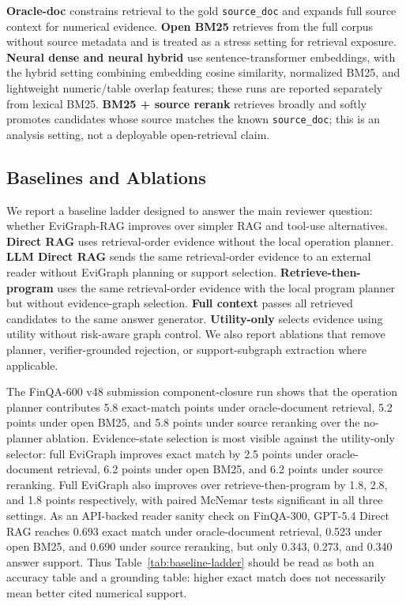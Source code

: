\documentclass[letterpaper]{article}
\begin{document}
\textbf{Oracle-doc} constrains retrieval to the gold \texttt{source\_doc} and expands full source context for numerical evidence.
\textbf{Open BM25} retrieves from the full corpus without source metadata and is treated as a stress setting for retrieval exposure.
\textbf{Neural dense and neural hybrid} use sentence-transformer embeddings, with the hybrid setting combining embedding cosine similarity, normalized BM25, and lightweight numeric/table overlap features; these runs are reported separately from lexical BM25.
\textbf{BM25 + source rerank} retrieves broadly and softly promotes candidates whose source matches the known \texttt{source\_doc}; this is an analysis setting, not a deployable open-retrieval claim.

\subsection{Baselines and Ablations}

We report a baseline ladder designed to answer the main reviewer question: whether EviGraph-RAG improves over simpler RAG and tool-use alternatives.
\textbf{Direct RAG} uses retrieval-order evidence without the local operation planner.
\textbf{LLM Direct RAG} sends the same retrieval-order evidence to an external reader without EviGraph planning or support selection.
\textbf{Retrieve-then-program} uses the same retrieval-order evidence with the local program planner but without evidence-graph selection.
\textbf{Full context} passes all retrieved candidates to the same answer generator.
\textbf{Utility-only} selects evidence using utility without risk-aware graph control.
We also report ablations that remove planner, verifier-grounded rejection, or support-subgraph extraction where applicable.

The FinQA-600 v48 submission component-closure run shows that the operation planner contributes 5.8 exact-match points under oracle-document retrieval, 5.2 points under open BM25, and 5.8 points under source reranking over the no-planner ablation.
Evidence-state selection is most visible against the utility-only selector: full EviGraph improves exact match by 2.5 points under oracle-document retrieval, 6.2 points under open BM25, and 6.2 points under source reranking.
Full EviGraph also improves over retrieve-then-program by 1.8, 2.8, and 1.8 points respectively, with paired McNemar tests significant in all three settings.
As an API-backed reader sanity check on FinQA-300, GPT-5.4 Direct RAG reaches 0.693 exact match under oracle-document retrieval, 0.523 under open BM25, and 0.690 under source reranking, but only 0.343, 0.273, and 0.340 answer support.
Thus Table~\ref{tab:baseline-ladder} should be read as both an accuracy table and a grounding table: higher exact match does not necessarily mean better cited numerical support.
\end{document}

